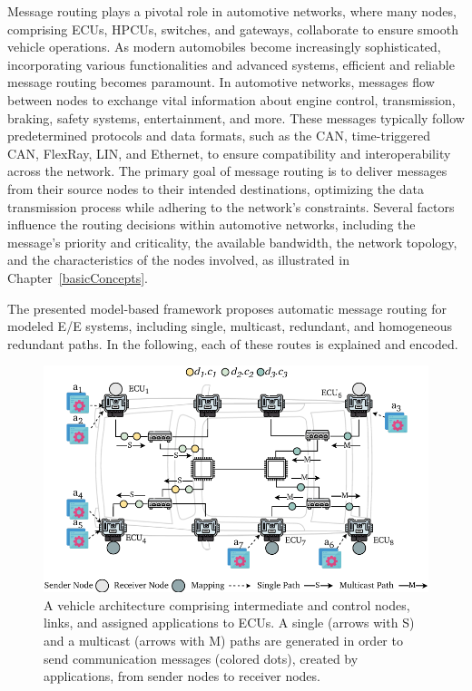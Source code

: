     Message routing plays a pivotal role in automotive networks, where many nodes, comprising ECUs, HPCUs, switches, and gateways, collaborate to ensure smooth vehicle operations. As modern automobiles become increasingly sophisticated, incorporating various functionalities and advanced systems, efficient and reliable message routing becomes paramount.
    In automotive networks, messages flow between nodes to exchange vital information about engine control, transmission, braking, safety systems, entertainment, and more. These messages typically follow predetermined protocols and data formats, such as the CAN, time-triggered CAN, FlexRay, LIN, and Ethernet, to ensure compatibility and interoperability across the network.
    The primary goal of message routing is to deliver messages from their source nodes to their intended destinations, optimizing the data transmission process while adhering to the network's constraints. Several factors influence the routing decisions within automotive networks, including the message's priority and criticality, the available bandwidth, the network topology, and the characteristics of the nodes involved, as illustrated in Chapter~\ref{basicConcepts}.
    
    
    
    The presented model-based framework proposes automatic message routing for modeled E/E systems, including single, multicast, redundant, and homogeneous redundant paths. In the following, each of these routes is explained and encoded.
    
    \begin{figure}[t]
    	\centering
    	\includegraphics[width=1\columnwidth]{figures/s_routing.pdf}
    	\caption{A vehicle architecture comprising intermediate and control nodes, links, and assigned applications to ECUs. A single (arrows with S) and a multicast (arrows with M) paths are generated in order to send communication messages (colored dots), created by applications, from sender nodes to receiver nodes.  
    	}
    	\label{routing_sm}
    \end{figure}
    
